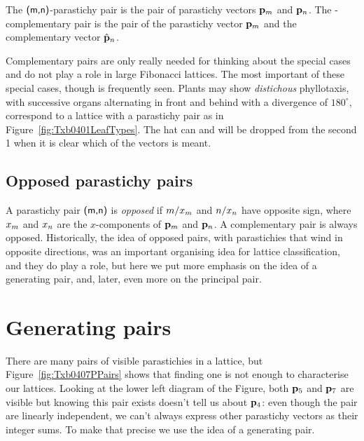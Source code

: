 \begin{definition}
The $\textsf{(m,n)}$-parastichy pair is the pair of parastichy vectors ${\mathbf p}_{m}$ and ${\mathbf p}_{n}$.
The -complementary pair is the pair of the parastichy vector ${\mathbf p}_{m}$ and the complementary vector $\hat{\mathbf p}_{n}$.
\label{def:pp}
\end{definition}
Complementary pairs are only really needed for thinking about the special cases  and do not play a role in large Fibonacci lattices. The most important of these special cases, though is frequently seen. Plants may show \textit{distichous} phyllotaxis, with successive organs  alternating in front and behind with a divergence of $180^\circ$, correspond to a lattice with a  parastichy pair as in Figure~\ref{fig:Txb0401LeafTypes}. The  hat can and will be dropped from the second \textsf{1} when it is clear which of the vectors is meant. 

\subsection{Opposed parastichy pairs}

A parastichy pair $\textsf{(m,n)}$ is \emph{opposed} if $m/x_m$ and $n/x_n$ have opposite sign, where $x_m$ and $x_n$ are the $x$-components of ${\mathbf p}_{m}$ and ${\mathbf p}_{n}$. A complementary pair  is always opposed. 
 Historically, the idea of opposed pairs, with parastichies that wind in opposite directions, was an important organising idea for lattice classification, and they do play a role, but here we put more emphasis on the idea of a {generating pair}, and, later,  even more on the principal pair. 




\section{Generating pairs}
There are many pairs of visible parastichies in a lattice, but Figure~\ref{fig:Txb0407PPairs}  shows that finding one is not enough to characterise our lattices.   Looking at the lower left diagram of the Figure, both ${\mathbf p}_{5}$ and ${\mathbf p}_{7}$ are visible but knowing this pair exists doesn't tell us about ${\mathbf p}_{4}$: even though the pair  are linearly independent, we can't always express other parastichy vectors as their integer sums.  To make that precise we use the idea of a generating pair. 

